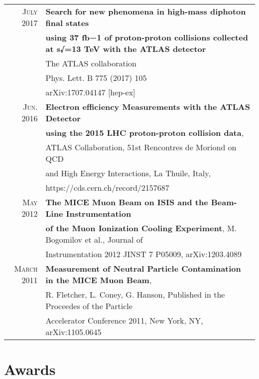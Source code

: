 \documentclass[a4paper,10pt]{article} %
\begin{document}
\begin{tabular}{rl}
\textsc{July} 2017 & \textbf{Search for new phenomena in high-mass diphoton final states}\\
									 & \textbf{using 37 fb−1 of proton-proton collisions collected at s√=13 TeV with the ATLAS detector}\\
									 & The ATLAS collaboration  \\
									 & Phys. Lett. B 775 (2017) 105 \\
									 & arXiv:1707.04147 [hep-ex]  \\
\textsc{Jun.} 2016 & \textbf{Electron efficiency Measurements with the ATLAS Detector} \\
									& \textbf{using the 2015 LHC proton-proton collision data}, \\
									& ATLAS Collaboration, 51st Rencontres de Moriond on QCD \\
									& and High Energy Interactions, La Thuile, Italy, \\
									& https://cds.cern.ch/record/2157687 \\
\textsc{May} 2012  & \textbf{The MICE Muon Beam on ISIS and the Beam-Line Instrumentation} \\
                   & \textbf{of the Muon Ionization Cooling Experiment}, M. Bogomilov et al., Journal of \\
				           & Instrumentation 2012 JINST 7 P05009, arXiv:1203.4089 \\
\textsc{March} 2011 & \textbf{Measurement of Neutral Particle Contamination in the MICE Muon Beam},\\
					          & R. Fletcher, L. Coney, G. Hanson, Published in the Proceedes of the Particle \\
                    & Accelerator Conference 2011, New York, NY, arXiv:1105.0645\\

\end{tabular}
\vspace{3mm}


\section{Awards}
\end{document}
